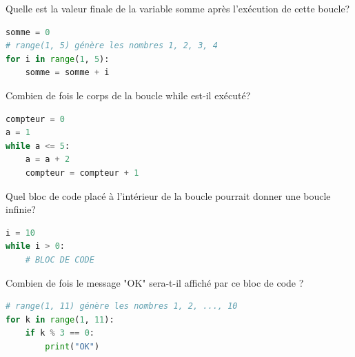 \begin{Exercise}[title={Boucles (For / While)}]
\Question Quelle est la valeur finale de la variable somme après l'exécution de cette boucle?

\begin{lstlisting}[style=pythonstyle, language=python]
somme = 0
# range(1, 5) génère les nombres 1, 2, 3, 4
for i in range(1, 5):
    somme = somme + i
\end{lstlisting}

\Question Combien de fois le corps de la boucle while est-il exécuté?
\begin{lstlisting}[style=pythonstyle, language=python]
compteur = 0
a = 1
while a <= 5:
    a = a + 2
    compteur = compteur + 1
\end{lstlisting}

\Question Quel bloc de code placé à l'intérieur de la boucle pourrait donner une boucle infinie?
\begin{lstlisting}[style=pythonstyle, language=python]
i = 10
while i > 0:
    # BLOC DE CODE
\end{lstlisting}

\Question Combien de fois le message "OK" sera-t-il affiché par ce bloc de code ?
\begin{lstlisting}[style=pythonstyle, language=python]
# range(1, 11) génère les nombres 1, 2, ..., 10
for k in range(1, 11):
    if k % 3 == 0:
        print("OK")
\end{lstlisting}
\end{Exercise}



